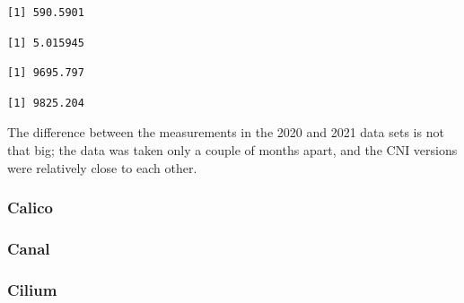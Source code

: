 \begin{verbatim}
[1] 590.5901
\end{verbatim}

\begin{Shaded}
\begin{Highlighting}[]
\SpecialCharTok{\$}
\end{Highlighting}
\end{Shaded}

\begin{verbatim}
[1] 5.015945
\end{verbatim}

\begin{Shaded}
\begin{Highlighting}[]
\SpecialCharTok{\$}
\end{Highlighting}
\end{Shaded}

\begin{verbatim}
[1] 9695.797
\end{verbatim}

\begin{Shaded}
\begin{Highlighting}[]
\SpecialCharTok{\$}
\end{Highlighting}
\end{Shaded}

\begin{verbatim}
[1] 9825.204
\end{verbatim}

The difference between the measurements in the 2020 and 2021 data sets is not that big; the data was taken only a couple of months apart, and the CNI versions were relatively close to each other.

\subsubsection{Calico}

\subsubsection{Canal}

\subsubsection{Cilium}

